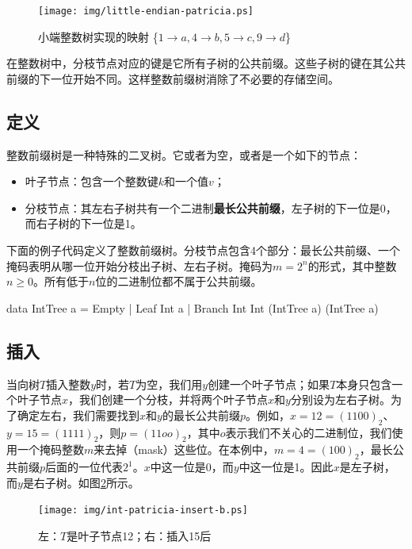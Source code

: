 \documentclass[b5paper]{ctexart}
\begin{document}
\begin{figure}[htbp]
  \centering
  \texttt{[image: img/little-endian-patricia.ps]}
  \caption{小端整数树实现的映射
     \{$ 1 \rightarrow a, 4 \rightarrow b, 5 \rightarrow c, 9 \rightarrow d$\}}
  \label{fig:little-endian-patricia}
\end{figure}

在整数树中，分枝节点对应的键是它所有子树的公共前缀。这些子树的键在其公共前缀的下一位开始不同。这样整数前缀树消除了不必要的存储空间。

\subsection{定义}

整数前缀树是一种特殊的二叉树。它或者为空，或者是一个如下的节点：

\begin{itemize}
\item 叶子节点：包含一个整数键$k$和一个值$v$；
\item 分枝节点：其左右子树共有一个二进制\textbf{最长公共前缀}，左子树的下一位是0，而右子树的下一位是1。
\end{itemize}

下面的例子代码定义了整数前缀树。分枝节点包含4个部分：最长公共前缀、一个掩码表明从哪一位开始分枝出子树、左右子树。掩码为$m = 2^n$的形式，其中整数$n \geq 0$。所有低于$n$位的二进制位都不属于公共前缀。

\begin{Haskell}
data IntTree a = Empty
               | Leaf Int a
               | Branch Int Int (IntTree a) (IntTree a)
\end{Haskell}

\subsection{插入}
当向树$T$插入整数$y$时，若$T$为空，我们用$y$创建一个叶子节点；如果$T$本身只包含一个叶子节点$x$，我们创建一个分枝，并将两个叶子节点$x$和$y$分别设为左右子树。为了确定左右，我们需要找到$x$和$y$的最长公共前缀$p$。例如，$x = 12 = (1100)_2$、$y = 15 = (1111)_2$，则$p = (11oo)_2$，其中$o$表示我们不关心的二进制位，我们使用一个掩码整数$m$来去掉（mask）这些位。在本例中，$m = 4 = (100)_2$，最长公共前缀$p$后面的一位代表$2^1$。$x$中这一位是0，而$y$中这一位是1。因此$x$是左子树，而$y$是右子树。如图\ref{fig:int-patricia-insert-b}所示。

\begin{figure}[htbp]
  \centering
  \texttt{[image: img/int-patricia-insert-b.ps]}
  \caption{左：$T$是叶子节点12；右：插入15后}
  \label{fig:int-patricia-insert-b}
\end{figure}
\end{document}
